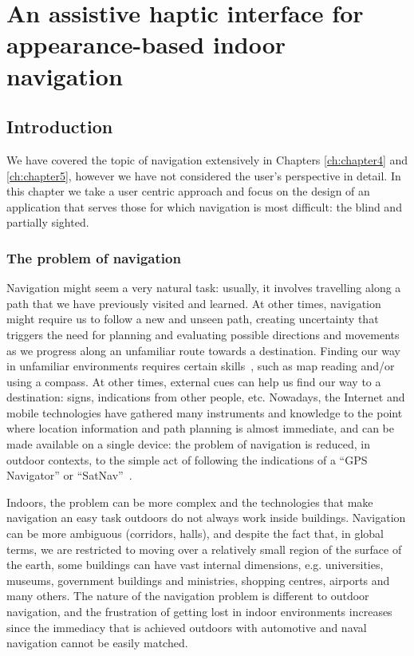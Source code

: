 \chapter{An assistive haptic interface for appearance-based indoor navigation}\label{ch:chapter6}

\section{Introduction}
\label{sec:Intro}

We have covered the topic of navigation extensively in Chapters \ref{ch:chapter4} and \ref{ch:chapter5}, however we have not considered the user's perspective in detail. In this chapter we take a user centric approach and focus on the design of an application that serves those for which navigation is most difficult: the blind and partially sighted.

\subsection{The problem of navigation}

 Navigation might seem a very natural task: usually, it involves travelling along a path that we have previously visited and learned. At other times, navigation might require us to follow a new and unseen path, creating uncertainty that triggers the need for planning and evaluating possible directions and movements as we progress along an unfamiliar route towards a destination. Finding our way in unfamiliar environments requires certain skills~\citep{foulke1982perception}, such as map reading and/or using a compass. At other times, external cues can help us find our way to a destination: signs, indications from other people, etc. Nowadays, the Internet and mobile technologies have gathered many instruments and knowledge to the point where location information and path planning is almost immediate, and can be made available on a single device: the problem of navigation is reduced, in outdoor contexts, to the simple act of following the indications of a ``GPS Navigator'' or ``SatNav''~\citep{spirkovska2005summary}.

Indoors, the problem can be more complex and the technologies that make navigation an easy task outdoors do not always work inside buildings. Navigation can be more ambiguous (corridors, halls), and despite the fact that, in global terms, we are restricted to moving over a relatively small region of the surface of the earth, some buildings can have vast internal dimensions, e.g. universities, museums, government buildings and ministries, shopping centres, airports and many others. The nature of the navigation problem is different to outdoor navigation, and the frustration of getting lost in indoor environments increases since the immediacy that is achieved outdoors with automotive and naval navigation cannot be easily matched.
 
